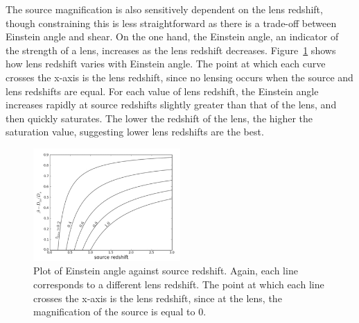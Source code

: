 		The source magnification is also sensitively dependent on the lens redshift, though constraining this is less straightforward as there is a trade-off between Einstein angle and shear. On the one hand, the Einstein angle, an indicator of the strength of a lens, increases as the lens redshift decreases. Figure~\ref{fig:Einstein_angle_as_a_function_of_source_redshift} shows how lens redshift varies with Einstein angle. The point at which each curve crosses the x-axis is the lens redshift, since no lensing occurs when the source and lens redshifts are equal. For each value of lens redshift, the Einstein angle increases rapidly at source redshifts slightly greater than that of the lens, and then quickly saturates\cite{Constraining_source_redshift_distributions}. The lower the redshift of the lens, the higher the saturation value, suggesting lower lens redshifts are the best.
		\begin{figure}[!htbp]
			\centering
				\includegraphics[width=0.5\textwidth]{../Images/Einstein_angle_as_a_function_of_source_redshift.png}
			\caption[Einstein angle as a function of source redshift]{\cite{Constraining_source_redshift_distributions} Plot of Einstein angle against source redshift. Again, each line corresponds to a different lens redshift. The point at which each line crosses the x-axis is the lens redshift, since at the lens, the magnification of the source is equal to 0.\label{fig:Einstein_angle_as_a_function_of_source_redshift}}
		\end{figure}

